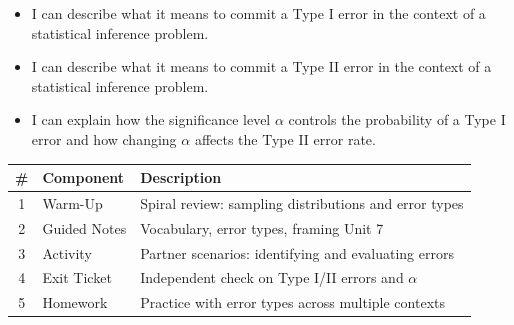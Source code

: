 \documentclass[10pt]{article}
\begin{document}

\vspace{2.4cm}
\namedateperiod

\begin{learningtargetbox}
\begin{itemize}
    \item I can describe what it means to commit a Type I error in the context of a
          statistical inference problem.
    \item I can describe what it means to commit a Type II error in the context of a
          statistical inference problem.
    \item I can explain how the significance level $\alpha$ controls the probability
          of a Type I error and how changing $\alpha$ affects the Type II error rate.
\end{itemize}
\end{learningtargetbox}

\begin{tocbox}
\renewcommand{\arraystretch}{1.5}
\begin{tabularx}{\linewidth}{clX}
    \textbf{\#} & \textbf{Component} & \textbf{Description} \\
    \hline
    1 & Warm-Up      & Spiral review: sampling distributions and error types \\
    2 & Guided Notes & Vocabulary, error types, framing Unit 7 \\
    3 & Activity     & Partner scenarios: identifying and evaluating errors \\
    4 & Exit Ticket  & Independent check on Type I/II errors and $\alpha$ \\
    5 & Homework     & Practice with error types across multiple contexts \\
\end{tabularx}
\end{tocbox}
\end{document}
